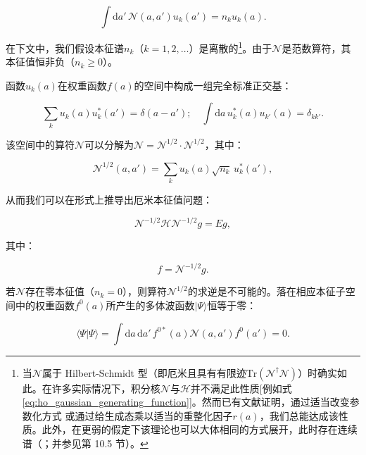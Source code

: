 \begin{equation}
\int\mathrm{d}a'\,\mathscr{N}(a,a')u_{k}(a')=n_{k}u_{k}(a).\label{eq:norm_kernel_eigenvalue_problem}
\end{equation}

在下文中，我们假设本征谱$n_{k}$（$k=1,2,\dots$）是离散的\footnote{当$\mathscr{N}$属于 Hilbert-Schmidt 型（即厄米且具有有限迹$\mathrm{Tr}(\mathscr{N}^{\dagger}\mathscr{N})$\cite{RS72}）时确实如此。在许多实际情况下，积分核$\mathscr{N}$与$\mathscr{H}$并不满足此性质{[}例如式\ref{eq:ho_gaussian_generating_function}{]}。然而已有文献证明，通过适当改变参数化方式
\cite{TP78} 或通过给生成态乘以适当的重整化因子$r(a)$\cite{La76}，我们总能达成该性质。此外，在更弱的假定下该理论也可以大体相同的方式展开，此时存在连续谱（\cite{TP78}；并参见第
10.5 节）。}。由于$\mathscr{N}$是范数算符，其本征值恒非负（$n_{k}\ge0$）。

函数$u_{k}(a)$在权重函数$f(a)$的空间中构成一组完全标准正交基：

\begin{equation}
\sum_{k}u_{k}(a)u^{*}_{k}(a')=\delta(a-a');\quad\int\mathrm{d}a\,u^{*}_{k}(a)u_{k'}(a)=\delta_{kk'}.\label{eq:weight_basis_orthonormality}
\end{equation}

该空间中的算符$\mathscr{N}$可以分解为$\mathscr{N}=\mathscr{N}^{1/2}\cdot\mathscr{N}^{1/2}$，其中：

\begin{equation}
\mathscr{N}^{1/2}(a,a')=\sum_{k}u_{k}(a)\sqrt{n_{k}}\,u^{*}_{k}(a'),\label{eq:norm_operator_decomposition}
\end{equation}

从而我们可以在形式上推导出厄米本征值问题：

\begin{equation}
\mathscr{N}^{-1/2}\mathscr{H}\mathscr{N}^{-1/2}g=Eg,\label{eq:hermitian_g_eigenvalue_problem}
\end{equation}

其中：

\begin{equation}
f=\mathscr{N}^{-1/2}g.\label{eq:f_and_g_relation}
\end{equation}

若$\mathscr{N}$存在零本征值（$n_{k}=0$），则算符$\mathscr{N}^{1/2}$的求逆是不可能的。落在相应本征子空间中的权重函数$f^{0}(a)$所产生的多体波函数$|\Psi\rangle$恒等于零：

\begin{equation}
\langle\Psi|\Psi\rangle=\int\mathrm{d}a\,\mathrm{d}a'\,f^{0*}(a)\mathscr{N}(a,a')f^{0}(a')=0.\label{eq:zero_norm_many_body_norm}
\end{equation}

